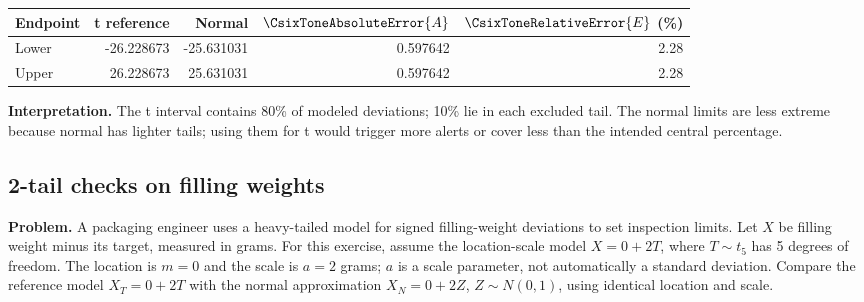 \begin{center}\begin{tabular}{lrrrr}\toprule Endpoint & t reference & Normal & $\CsixToneAbsoluteError{A}$ & $\CsixToneRelativeError{E}$ (\%)\\\midrule
Lower&-26.228673&-25.631031&0.597642&2.28\\
Upper&26.228673&25.631031&0.597642&2.28\\
\bottomrule\end{tabular}\end{center}
\textbf{Interpretation.} The t interval contains 80\% of modeled deviations; 10\% lie in each excluded tail. The normal limits are less extreme because normal has lighter tails; using them for t would trigger more alerts or cover less than the intended central percentage.


\clearpage
\subsection{2-tail checks on filling weights}
\label{c9-i5}
\textbf{Problem.} A packaging engineer uses a heavy-tailed model for signed filling-weight deviations to set inspection limits. Let $X$ be filling weight minus its target, measured in grams. For this exercise, assume the location-scale model $X=0+2T$, where $T\sim t_{5}$ has 5 degrees of freedom. The location is $m=0$ and the scale is $a=2$ grams; $a$ is a scale parameter, not automatically a standard deviation. Compare the reference model $X_T=0+2T$ with the normal approximation $X_N=0+2Z$, $Z\sim N(0,1)$, using identical location and scale.
